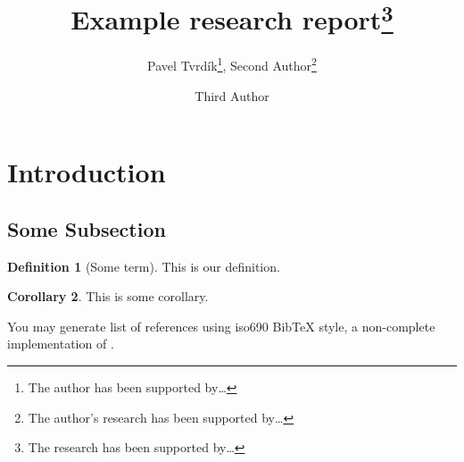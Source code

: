 \documentclass[english,technical,10pt]{FITreport}[2015/04/12]
\title{Example research report\thanks{The research has been supported by\dots}}
\author{Pavel Tvrd{\' i}k\thanks{The author has been supported by\dots}, Second Author\thanks{The author's research has been supported by\dots}\affil{Department of Computer Systems\\\theFIT}
	\and Third Author\affil{Another University}}
\begin{document}
\theoremstyle{definition}
\newtheorem{lemma}{Lemma}
\newtheorem{theorem}[lemma]{Theorem}
\newtheorem{definition}[lemma]{Definition}
\newtheorem{preposition}[lemma]{Preposition}
\newtheorem{example}[lemma]{Example}
\newtheorem{corollary}[lemma]{Corollary}
\newtheorem{proposition}[lemma]{Proposition}
\newtheorem{property}[lemma]{Property}
\newtheorem{observation}[lemma]{Observation}
\theoremstyle{remark}
\newtheorem{notation}[lemma]{Notation}
\newtheorem{note}[lemma]{Note}




\section{Introduction}

\subsection{Some Subsection}

\begin{definition}[Some term]
    This is our definition.
\end{definition}

\begin{corollary}
    This is some corollary.
\end{corollary}

You may generate list of references using iso690 Bib\TeX{} style, a non-complete implementation of \cite{iso690}.



    
\end{document}
